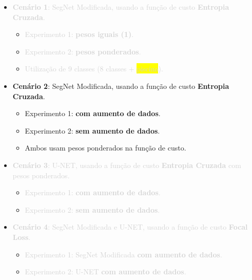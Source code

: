 \documentclass[%
  10pt,%
  aspectratio = 169,%
  compress,%
  t,%
  english,%
  brazilian,%
  tikz,
]{beamer}
\begin{document}
\begin{frame}

    \begin{itemize}
        \item \textcolor{lightgray}{\textbf{Cenário 1}: SegNet Modificada, usando a função de custo \textbf{Entropia Cruzada}.}
        \begin{itemize}
            \item \textcolor{lightgray}{Experimento 1: \textbf{pesos iguais (1)}.}
            \item \textcolor{lightgray}{Experimento 2: \textbf{pesos ponderados}.}
            \item \textcolor{lightgray}{Utilização de 9 classes (8 classes + \colorbox{yellow}{piscina}).}
        \end{itemize}
    \end{itemize}
    \begin{itemize}
        \item \textbf{Cenário 2}: SegNet Modificada, usando a função de custo \textbf{Entropia Cruzada}.
        \begin{itemize}
            \item Experimento 1: \textbf{com aumento de dados}.
            \item Experimento 2: \textbf{sem aumento de dados}.
            \item Ambos usam pesos ponderados na função de custo.
        \end{itemize}
    \end{itemize}
    \begin{itemize}
        \item \textcolor{lightgray}{\textbf{Cenário 3}: U-NET, usando a função de custo \textbf{Entropia Cruzada} com pesos ponderados.}
        \begin{itemize}
            \item \textcolor{lightgray}{Experimento 1: \textbf{com aumento de dados}.}
            \item \textcolor{lightgray}{Experimento 2: \textbf{sem aumento de dados}.}
        \end{itemize}
    \end{itemize}
    \begin{itemize}
        \item \textcolor{lightgray}{\textbf{Cenário 4}: SegNet Modificada e U-NET, usando a função de custo \textbf{Focal Loss}.}
        \begin{itemize}
            \item \textcolor{lightgray}{Experimento 1: SegNet Modificada \textbf{com aumento de dados}.}
            \item \textcolor{lightgray}{Experimento 2: U-NET \textbf{com aumento de dados}.}
        \end{itemize}
    \end{itemize}
    
\end{frame}
\end{document}

